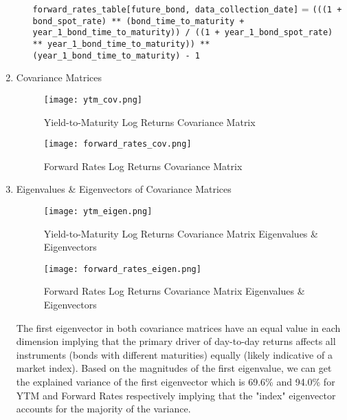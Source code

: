 \documentclass{article}
\begin{document}
\begin{enumerate}
\begin{enumerate}
\begin{algorithm}[H]
\begin{algorithmic}[1]
                            \State \texttt{forward\_rates\_table[future\_bond, data\_collection\_date]} =
                            \Statex \hspace{1cm} \texttt{(((1 + bond\_spot\_rate) ** (bond\_time\_to\_maturity + year\_1\_bond\_time\_to\_maturity)) / ((1 + year\_1\_bond\_spot\_rate) ** year\_1\_bond\_time\_to\_maturity)) ** (year\_1\_bond\_time\_to\_maturity) - 1}
                            \EndFor
                            \EndFor
                        \end{algorithmic}
                    \end{algorithm}
          \end{enumerate}


    \item Covariance Matrices
          \begin{figure}[H]
              \centering
              \begin{minipage}{0.45\textwidth}
                  \centering
                  \texttt{[image: ytm\_cov.png]}
                  \caption{Yield-to-Maturity Log Returns Covariance Matrix}
              \end{minipage}
              \hfill
              \begin{minipage}{0.45\textwidth}
                  \centering
                  \texttt{[image: forward\_rates\_cov.png]}
                  \caption{Forward Rates Log Returns Covariance Matrix}
              \end{minipage}
          \end{figure}
    \item Eigenvalues \& Eigenvectors of Covariance Matrices
          \begin{figure}[H]
              \centering
              \begin{minipage}{0.45\textwidth}
                  \centering
                  \texttt{[image: ytm\_eigen.png]}
                  \caption{Yield-to-Maturity Log Returns Covariance Matrix Eigenvalues \& Eigenvectors}
              \end{minipage}
              \hfill
              \begin{minipage}{0.45\textwidth}
                  \centering
                  \texttt{[image: forward\_rates\_eigen.png]}
                  \caption{Forward Rates Log Returns Covariance Matrix Eigenvalues \& Eigenvectors}
              \end{minipage}
          \end{figure}

          The first eigenvector in both covariance matrices have an equal value in each dimension implying that the primary driver of day-to-day returns affects all instruments (bonds with different maturities) equally (likely indicative of a market index). Based on the magnitudes of the first eigenvalue, we can get the explained variance of the first eigenvector which is 69.6\% and 94.0\% for YTM and Forward Rates respectively implying that the "index" eigenvector accounts for the majority of the variance.
\end{enumerate}
\end{document}
